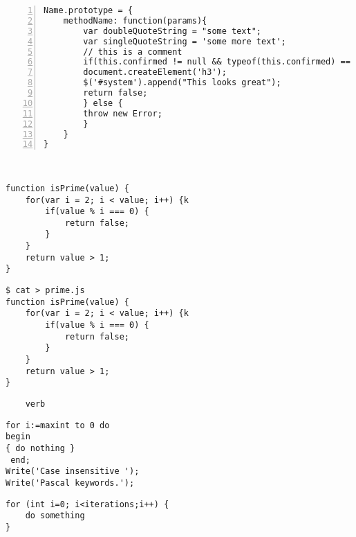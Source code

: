 \begin{lstlisting}[language=JavaScript2,numbers=left,caption=ccc]
Name.prototype = {
    methodName: function(params){
        var doubleQuoteString = "some text";
        var singleQuoteString = 'some more text';
        // this is a comment
        if(this.confirmed != null && typeof(this.confirmed) == Boolean && this.confirmed == true){
        document.createElement('h3');
        $('#system').append("This looks great");
        return false;
        } else {
        throw new Error;
        }
    }
}
\end{lstlisting}

\clearpage
\blindtext\\

\begin{lstlisting}[language=JavaScript2,numbers=none,caption=Listing 2,frame=shadowbox]
function isPrime(value) {
    for(var i = 2; i < value; i++) {k
        if(value % i === 0) {
            return false;
        }
    }
    return value > 1;
}
\end{lstlisting}

\blindtext

\begin{verbatim}
$ cat > prime.js
function isPrime(value) {
    for(var i = 2; i < value; i++) {k
        if(value % i === 0) {
            return false;
        }
    }
    return value > 1;
}
\end{verbatim}

\begin{verbatim}
    verb
\end{verbatim}

\begin{comment}
\begin{figure}
    \begin{verbatim}
        int main()
        {
            this is some code
        }
    \end{verbatim}
    \caption{My Caption}
    \label{my-label}
\end{figure}
\end{comment}

\lstset{language=Pascal}
\begin{lstlisting}[frame=leftline]  % Start your code-block
for i:=maxint to 0 do
begin
{ do nothing }
 end;
Write('Case insensitive ');
Write('Pascal keywords.');
\end{lstlisting}
 
\lstset {language=C++}
\begin{lstlisting}
for (int i=0; i<iterations;i++) {
    do something
}
\end{lstlisting}

